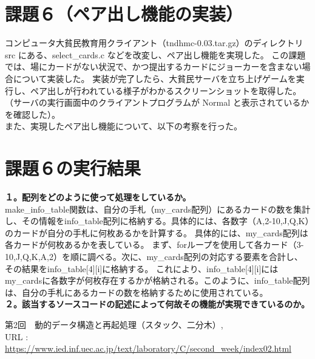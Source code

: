 \documentclass[]{jsarticle}
\begin{document}
\section*{課題６（ペア出し機能の実装）}
コンピュータ大貧民教育用クライアント（tndhmc-0.03.tar.gz）のディレクトリ src にある、select\_cards.c などを改変し、ペア出し機能を実現した。
この課題では、場にカードがない状況で、かつ提出するカードにジョーカーを含まない場合について実装した。
実装が完了したら、大貧民サーバを立ち上げゲームを実行し、ペア出しが行われている様子がわかるスクリーンショットを取得した。
（サーバの実行画面中のクライアントプログラムが Normal と表示されているかを確認した）。\\

\noindent また、実現したペア出し機能について、以下の考察を行った。\\


\section*{課題６の実行結果}



\noindent\textbf{１。配列をどのように使って処理をしているか。}\\
make\_info\_table関数は、自分の手札（my\_cards配列）にあるカードの数を集計し、その情報をinfo\_table配列に格納する。具体的には、各数字（A,2-10,J,Q,K）のカードが自分の手札に何枚あるかを計算する。
具体的には、my\_cards配列は各カードが何枚あるかを表している。
まず、forループを使用して各カード（3-10,J,Q,K,A,2）を順に調べる。次に、my\_cards配列の対応する要素を合計し、その結果をinfo\_table[4][i]に格納する。
これにより、info\_table[4][i]にはmy\_cardsに各数字が何枚存在するかが格納される。このように、info\_table配列は、自分の手札にあるカードの数を格納するために使用されている。\\

\noindent\textbf{２。該当するソースコードの記述によって何故その機能が実現できているのか。}\\



\newpage
\begin{thebibliography}{99}
   第2回　動的データ構造と再起処理（スタック、二分木）, \\URL : \url{https://www.ied.inf.uec.ac.jp/text/laboratory/C/second_week/index02.html}
\end{thebibliography}
\end{document}
